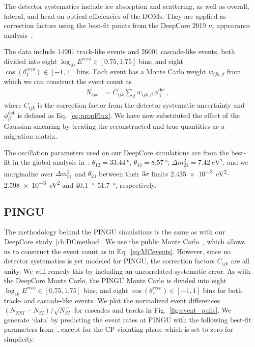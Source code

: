 \documentclass[draft=True]{revtex4-2}
\newcommand{\zreco}{\ensuremath{\cos{(\theta_z^{reco})}}}
\newcommand{\dm}{\Delta m^2_{31}}
\begin{document}
The detector systematics include ice absorption and scattering, as well as overall, lateral, and head-on optical efficiencies of the DOMs. 
They are applied as correction factors using the best-fit points from the DeepCore 2019 $\nu_\tau$ appearance 
analysis~\cite{DC2019tauappearance}.

The data include 14901 track-like events and 26001 cascade-like events, both divided into eight 
$ \log_{10}E^{reco} \in [0.75,1.75]$ bins, and eight $\zreco \in [-1,1]$ bins. Each event has a Monte Carlo weight $w_{ijk,\beta}$
from which we can construct the event count as
\begin{align}\label{eq:MCevents}
    N_{ijk} &= C_{ijk}\sum_{\beta}w_{ijk,\beta}\, \phi_\beta^\text{det}\,,
\end{align}
where $C_{ijk}$ is the correction factor from the detector systematic uncertainty and $\phi_\beta^\text{det}$ is defined as Eq.~\ref{eq:propFlux}. We have now substituted the effect of the Gaussian smearing 
by treating the reconstructed and true quantities as a migration matrix. 

The oscillation parameters used on our DeepCore simulations are from the
best-fit in the global analysis in~\cite{nufit}: $\theta_{12} = \SI{33.44}{\degree},\, \theta_{13} = \SI{8.57}{\degree},\, \Delta m^2_{21} =  \SI{7.42}{\electronvolt^2}$, and we 
marginalize over $\dm$ and $\theta_{23}$ between their $3\sigma$ limits \SIrange{2.435e-3}{2.598e-3}{\eV \squared} and \SIrange{40.1}{51.7}{\degree}, respectively.

\subsection{PINGU}\label{ch:PINGUmethod}
The methodology behind the PINGU simulations is the same as with our DeepCore study~\ref{ch:DCmethod}. We use the public Monte Carlo~\cite{PINGUdata}, 
which allows us to construct the event count as in Eq.~\ref{eq:MCevents}.
However, since no detector systematics is yet modeled for PINGU, the correction factors $C_{ijk}$ are all unity. We will remedy this by including an uncorrelated systematic error.
As with the DeepCore Monte Carlo, the PINGU Monte Carlo is divided into eight 
$\log_{10}E^{reco} \in [0.75,1.75]$ bins, and eight $\zreco \in [-1,1]$ bins for both track- and cascade-like events. 
We plot the normalized event differences $(N_{NSI} - N_{SI})/\sqrt{N_{SI}}$ for cascades and tracks in Fig.~\ref{fig:event_pulls}. %
We generate `data' by predicting the event rates at PINGU with the following best-fit parameters from~\cite{nufit}, except for the CP-violating phase which is set to zero for simplicity.
\end{document}

